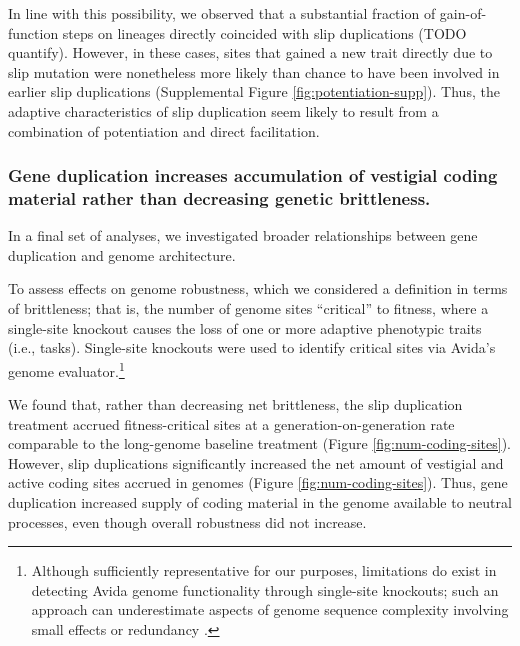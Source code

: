In line with this possibility, we observed that a substantial fraction of gain-of-function steps on lineages directly coincided with slip duplications (TODO quantify).
However, in these cases, sites that gained a new trait directly due to slip mutation were nonetheless more likely than chance to have been involved in earlier slip duplications (Supplemental Figure \ref{fig:potentiation-supp}).
Thus, the adaptive characteristics of slip duplication seem likely to result from a combination of potentiation and direct facilitation.

\subsubsection{Gene duplication increases accumulation of vestigial coding material rather than decreasing genetic brittleness.}



In a final set of analyses, we investigated broader relationships between gene duplication and genome architecture.

To assess effects on genome robustness, which we considered a definition in terms of brittleness;
that is, the number of genome sites ``critical'' to fitness, where a single-site knockout causes the loss of one or more adaptive phenotypic traits (i.e., tasks).
Single-site knockouts were used to identify critical sites via Avida's genome evaluator.\footnote{%
Although sufficiently representative for our purposes, limitations do exist in detecting Avida genome functionality through single-site knockouts; such an approach can underestimate aspects of genome sequence complexity involving small effects or redundancy \citep{moreno2024cryptic}.
}

We found that, rather than decreasing net brittleness, the slip duplication treatment accrued fitness-critical sites at a generation-on-generation rate comparable to the long-genome baseline treatment (Figure \ref{fig:num-coding-sites}).
However, slip duplications significantly increased the net amount of vestigial and active coding sites accrued in genomes (Figure \ref{fig:num-coding-sites}).
Thus, gene duplication increased supply of coding material in the genome available to neutral processes, even though overall robustness did not increase.


